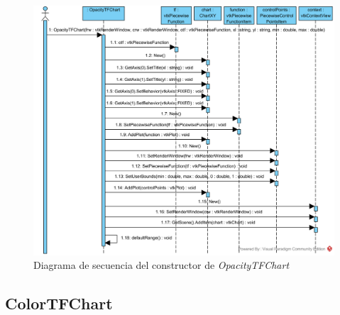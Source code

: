 \begin{figure}[H]
	\centering
	\includegraphics[angle=90,width=12cm]{imagenes/diagramas/secuencia/OpacityTFChart_New}
	\caption{Diagrama de secuencia del constructor de \textit{OpacityTFChart}}
	\label{fig:diagrama_secuencia_opacitytfchart_new}
\end{figure}

\subsection{ColorTFChart}

